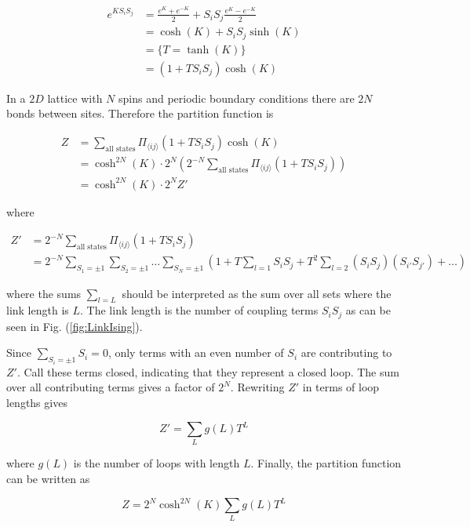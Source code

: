 \begin{align*}
    e^{KS_i S_j} &= \frac{e^K + e^{-K}}{2} + S_i S_j \frac{e^K - e^{-K}}{2} \\
    &= \cosh (K) + S_i S_j \sinh(K) \\
    &= \{ T = \tanh(K) \} \\
    &= (1 + T S_i S_j) \cosh(K)
\end{align*}

In a $2D$ lattice with $N$ spins and periodic boundary conditions there are $2N$ bonds between sites. Therefore the partition function is

\begin{align*}
    Z &= \sum_{\text{all states}} \Pi_{\langle ij \rangle} (1 + T S_i S_j) \cosh(K) \\
    &= \cosh^{2N} (K) \cdot 2^N \left ( 2^{-N} \sum_{\text{all states}} \Pi_{\langle ij \rangle} (1 + T S_i S_j) \right ) \\
    &= \cosh^{2N} (K) \cdot 2^N Z'
\end{align*}

\noindent where

\begin{align*}
    Z' &= 2^{-N} \sum_{\text{all states}} \Pi_{\langle ij \rangle} (1 + T S_i S_j) \\
    &= 2^{-N} \sum_{S_1 = \pm 1} \sum_{S_2 = \pm 1} \ldots \sum_{S_N = \pm 1} \left ( 1 + T \sum_{l = 1} S_i S_j + T^2 \sum_{l = 2} (S_i S_j)(S_{i'} S_{j'}) + \ldots \right ) 
\end{align*}

\noindent where the sums $\sum_{l=L}$ should be interpreted as the sum over all sets where the link length is $L$. The link length is the number of coupling terms $S_i S_j$ as can be seen in Fig. (\ref{fig:LinkIsing}).


Since $\sum_{S_i = \pm 1} S_i = 0$, only terms with an even number of $S_i$ are contributing to $Z'$. Call these terms closed, indicating that they represent a closed loop. The sum over all contributing terms gives a factor of $2^N$. Rewriting $Z'$ in terms of loop lengths gives

\begin{equation}
    Z' = \sum_L g(L) T^L
\end{equation}

\noindent where $g(L)$ is the number of loops with length $L$. Finally, the partition function can be written as

\begin{equation}
    Z = 2^N \cosh^{2N} (K) \sum_L g(L) T^L
\end{equation}


